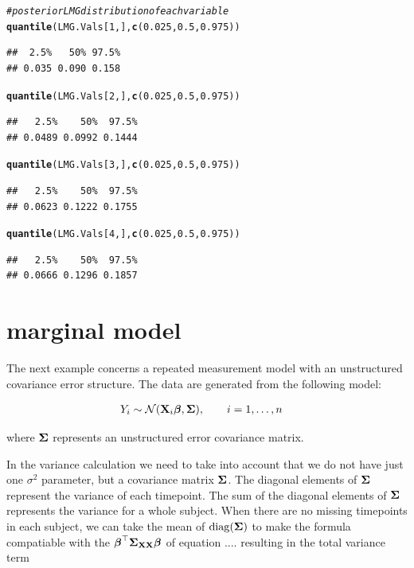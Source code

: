 \documentclass[11pt,a4paper,twoside]{book}\usepackage[]{graphicx}\usepackage[]{color}
\makeatletter
\newcommand{\hlnum}[1]{\textcolor[rgb]{0.686,0.059,0.569}{#1}}%
\newcommand{\hlcom}[1]{\textcolor[rgb]{0.678,0.584,0.686}{\textit{#1}}}%
\newcommand{\hlstd}[1]{\textcolor[rgb]{0.345,0.345,0.345}{#1}}%
\newcommand{\hlkwd}[1]{\textcolor[rgb]{0.737,0.353,0.396}{\textbf{#1}}}%
\newenvironment{kframe}{%
 \def\at@end@of@kframe{}%
 \ifinner\ifhmode%
  \def\at@end@of@kframe{\end{minipage}}%
  \begin{minipage}{\columnwidth}%
 \fi\fi%
 \def\FrameCommand##1{\hskip\@totalleftmargin \hskip-\fboxsep
 \colorbox{shadecolor}{##1}\hskip-\fboxsep
     \hskip-\linewidth \hskip-\@totalleftmargin \hskip\columnwidth}%
 \MakeFramed {\advance\hsize-\width
   \@totalleftmargin\z@ \linewidth\hsize
   \@setminipage}}%
 {\par\unskip\endMakeFramed%
 \at@end@of@kframe}
\newenvironment{knitrout}{}{} %
\makeatother
\begin{document}
\begin{knitrout}
\begin{kframe}
\begin{alltt}
\hlcom{# posterior LMG distribution of each variable}
\hlkwd{quantile}\hlstd{(LMG.Vals[}\hlnum{1}\hlstd{,],} \hlkwd{c}\hlstd{(}\hlnum{0.025}\hlstd{,} \hlnum{0.5}\hlstd{,} \hlnum{0.975}\hlstd{))}
\end{alltt}
\begin{verbatim}
##  2.5%   50% 97.5% 
## 0.035 0.090 0.158
\end{verbatim}
\begin{alltt}
\hlkwd{quantile}\hlstd{(LMG.Vals[}\hlnum{2}\hlstd{,],} \hlkwd{c}\hlstd{(}\hlnum{0.025}\hlstd{,} \hlnum{0.5}\hlstd{,} \hlnum{0.975}\hlstd{))}
\end{alltt}
\begin{verbatim}
##   2.5%    50%  97.5% 
## 0.0489 0.0992 0.1444
\end{verbatim}
\begin{alltt}
\hlkwd{quantile}\hlstd{(LMG.Vals[}\hlnum{3}\hlstd{,],} \hlkwd{c}\hlstd{(}\hlnum{0.025}\hlstd{,} \hlnum{0.5}\hlstd{,} \hlnum{0.975}\hlstd{))}
\end{alltt}
\begin{verbatim}
##   2.5%    50%  97.5% 
## 0.0623 0.1222 0.1755
\end{verbatim}
\begin{alltt}
\hlkwd{quantile}\hlstd{(LMG.Vals[}\hlnum{4}\hlstd{,],} \hlkwd{c}\hlstd{(}\hlnum{0.025}\hlstd{,} \hlnum{0.5}\hlstd{,} \hlnum{0.975}\hlstd{))}
\end{alltt}
\begin{verbatim}
##   2.5%    50%  97.5% 
## 0.0666 0.1296 0.1857
\end{verbatim}
\end{kframe}
\end{knitrout}

\section{marginal  model}

The next example concerns a repeated measurement model with an unstructured covariance error structure. The data are generated from the following model:

\begin{align} 
&Y_{i} \sim \mathcal{N}({\mathbf{X}}_{i} {\boldsymbol{\beta}}, {\boldsymbol{\Sigma}}{}), \qquad i = 1, \dots, n
\end{align} 

where ${\boldsymbol{\Sigma}}{}$ represents an unstructured error covariance matrix.

In the variance calculation we need to take into account that we do not have just one $\sigma^2$ parameter, but a covariance matrix ${\boldsymbol{\Sigma}}{}$. The diagonal elements of ${\boldsymbol{\Sigma}}{}$ represent the variance of each timepoint. The sum of the diagonal elements of ${\boldsymbol{\Sigma}}{}$ represents the variance for a whole subject. When there are no missing timepoints in each subject, we can  take the mean of $\operatorname{diag}({\boldsymbol{\Sigma}}{})$ to make the formula compatiable with the ${\boldsymbol{\beta}}^\top {\boldsymbol{\Sigma}}{}_{{\mathbf{X}} {\mathbf{X}}}  {\boldsymbol{\beta}}$ of equation .... resulting in the total variance term
\end{document}

